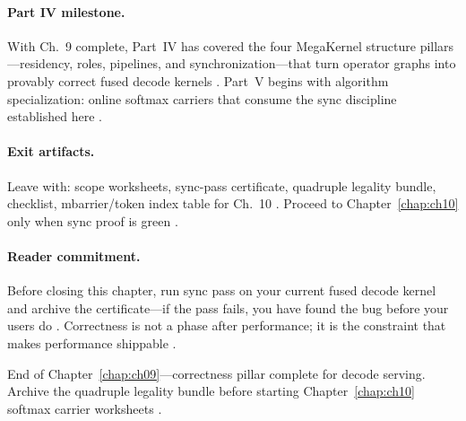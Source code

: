 \paragraph{Part IV milestone.}
With Ch.~9 complete, Part~IV has covered the four MegaKernel structure pillars---residency, roles, pipelines, and synchronization---that turn operator graphs into provably correct fused decode kernels \citep{dao2022flashattention,mpk2025,yirage2026,shah2024flashattention3}.
Part~V begins with algorithm specialization: online softmax carriers that consume the sync discipline established here \citep{dao2022flashattention,memoryfloor2026,patel2025llminference}.

\paragraph{Exit artifacts.}
Leave with: scope worksheets, sync-pass certificate, quadruple legality bundle, checklist, mbarrier/token index table for Ch.~10 \citep{yirage2026,chen2020compilerbasedhardw,dao2022flashattention,shah2024flashattention3,semianalysis2024tma,patel2025llminference,taxbreak2026}.
Proceed to Chapter~\ref{chap:ch10} only when sync proof is green \citep{dao2022flashattention,memoryfloor2026,mpk2025}.

\paragraph{Reader commitment.}
Before closing this chapter, run sync pass on your current fused decode kernel and archive the certificate---if the pass fails, you have found the bug before your users do \citep{yirage2026,wu2024mirage,taxbreak2026,shah2024flashattention3}.
Correctness is not a phase after performance; it is the constraint that makes performance shippable \citep{mpk2025,patel2025llminference,chen2020compilerbasedhardw}.

End of Chapter~\ref{chap:ch09}---correctness pillar complete for decode serving.
Archive the quadruple legality bundle before starting Chapter~\ref{chap:ch10} softmax carrier worksheets \citep{yirage2026,dao2022flashattention,chen2020compilerbasedhardw}.

